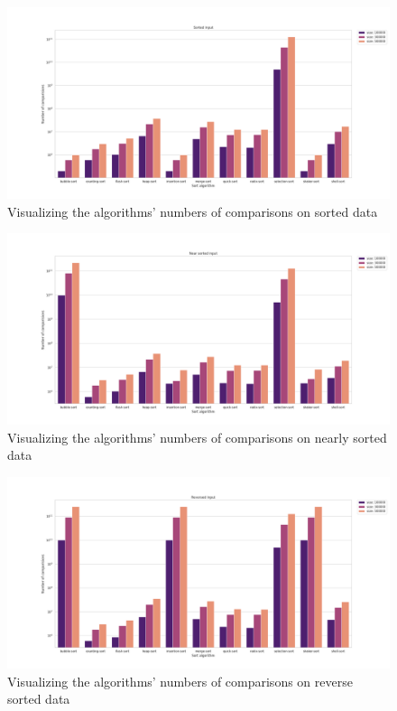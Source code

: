 \documentclass[11pt,a4paper]{article}
\begin{document}
\begin{figure}[H]
  \includegraphics[width = 16cm]{plot/sorted_bar.png}
  \centering
  \caption{Visualizing the algorithms' numbers of comparisons on sorted data}
\end{figure}

\begin{figure}[H]
  \includegraphics[width = 16cm]{plot/nsorted_bar.png}
  \centering
  \caption{Visualizing the algorithms' numbers of comparisons on nearly sorted data}
\end{figure}

\begin{figure}[H]
  \includegraphics[width = 16cm]{plot/rev_bar.png}
  \centering
  \caption{Visualizing the algorithms' numbers of comparisons on reverse sorted data}
\end{figure}
\end{document}
